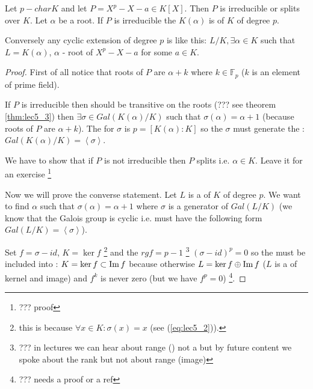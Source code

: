 \begin{theorem}
  Let $p - char K$ and let
  $P = X^p - X - a \in K\left[X\right]$. Then $P$ is irreducible or
  splits over $K$. Let $\alpha$ be a root. If $P$ is irreducible the
  $K\left(\alpha\right)$ is  of $K$ of
  degree $p$.

  Conversely any cyclic extension of degree $p$ is like this: $L/K,
  \exists \alpha \in K$ such that $L = K\left(\alpha\right)$, $\alpha$
  - root of $X^p - X - a$ for some $a \in K$.
  \begin{proof}
    First of all notice that roots of $P$ are $\alpha + k$ where $k
    \in \mathbb{F}_p$ ($k$ is an element of prime field).

    If $P$ is irreducible then  should be
    transitive on the roots (??? see theorem \ref{thm:lec5_3})  then
    $\exists \sigma \in Gal\left(K\left(\alpha\right)/K\right)$ such that
    $\sigma\left(\alpha\right) = \alpha + 1$ (because roots of $P$ are
    $\alpha + k$). The  for $\sigma$ is
    $p = \left[K\left(\alpha\right):K\right]$ so the $\sigma$ must
    generate the :
    $Gal\left(K\left(\alpha\right)/K\right) = \left<\sigma\right>$.

    We have to show that if $P$ is not irreducible then $P$ splits
    i.e. $\alpha \in K$. Leave it for an exercise
    \footnote{
      ??? proof
    }

    Now we will prove the converse statement. Let $L$ is a
     of $K$ of degree $p$. We want to
    find $\alpha$ such that $\sigma\left(\alpha\right) = \alpha + 1$
    where $\sigma$ is a generator of $Gal\left(L/K\right)$ (we know
    that the Galois group is cyclic i.e. must have the following form
    $Gal\left(L/K\right) = \left<\sigma\right>$).

    Set $f = \sigma -id$, $K = \ker f$
    \footnote{
      this is because
      $\forall x \in K: \sigma\left(x\right) = x$ (see
      (\ref{eq:lec5_2})).
    }
    and the  $rg f = p -1$
    \footnote{
      ??? in lectures we can hear about range () not a
       but by future content we spoke about the rank
      but not about range (image)
    }
    $\left(\sigma - id\right)^p = 0$ so the  must
    be included into : $K = \ker f \subset \operatorname{Im} f$
    because otherwise $L = \ker f \oplus \operatorname{Im} f$ ($L$ is a
     of 
    kernel and image) and $f^k$ is never zero (but we have $f^p = 0$)
    \footnote{
      ??? needs a proof or a ref
    }.


\end{proof}
\end{theorem}

